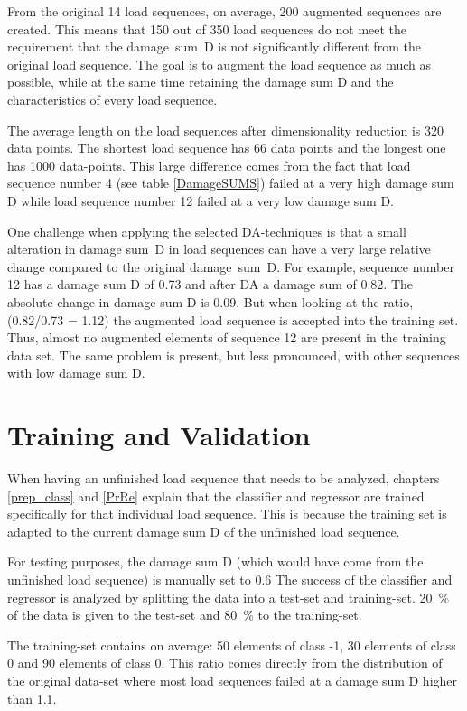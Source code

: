 From the original 14 load sequences, on average, 200 augmented sequences are created. This means that 150 out of 350 load sequences do not meet the requirement that the damage~sum~D is not significantly different from the original load sequence. 
The goal is to augment the load sequence as much as possible, while at the same time retaining the damage sum D and the characteristics of every load sequence. 


The average length on the load sequences after dimensionality reduction is 320 data points. The shortest load sequence has 66 data points and the longest one has 1000 data-points. This large difference comes from the fact that load sequence number 4 (see table \ref{DamageSUMS}) failed at a very high damage sum D while load sequence number 12 failed at a very low damage sum D.

One challenge when applying the selected DA-techniques is that a small alteration in damage sum~D in load sequences can have a very large relative change compared to the original damage~sum~D. For example, sequence number 12 has a damage sum D of 0.73 and after DA a damage sum of 0.82. The absolute change in damage sum D is 0.09. But when looking at the ratio, (0.82/0.73 = 1.12) the augmented load sequence is accepted into the training set. Thus, almost no augmented elements of sequence 12 are present in the training data set. The same problem is present, but less pronounced, with other sequences with low damage sum D.



\section{Training and Validation}
When having an unfinished load sequence that needs to be analyzed, chapters \ref{prep_class} and \ref{PrRe} explain that the classifier and regressor are trained specifically for that individual load sequence. This is because the training set is adapted to the current damage sum D of the unfinished load sequence.

For testing purposes, the damage sum D (which would have come from the unfinished load sequence) is manually set to 0.6
The success of the classifier and regressor is analyzed by splitting the data into a test-set and training-set. 
20~\% of the data is given to the test-set and 80~\% to the training-set.

The training-set contains on average: 50 elements of class -1, 30 elements of class 0 and 90 elements of class 0. This ratio comes directly from the distribution of the original data-set where most load sequences failed at a damage sum D higher than 1.1.

